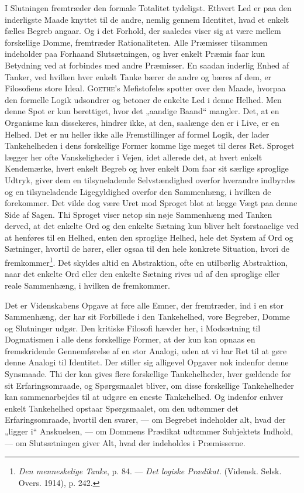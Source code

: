 \documentclass[12pt]{article}
\newcommand{\opage}[1]{\marginnote{\footnotesize\textit{[#1]}}}
\begin{document}
I Slutningen fremtræder den formale Totalitet tydeligst. Ethvert Led er paa den
inderligste Maade knyttet til de andre, nemlig gennem Identitet, hvad et enkelt
fælles Begreb angaar. Og i det Forhold, der saaledes viser sig at være mellem
forskellige Domme, fremtræder Rationaliteten. Alle Præmisser tilsammen indeholder
paa Forhaand Slutsætningen, og hver enkelt Præmis faar kun Betydning ved
at forbindes med andre Præmisser. En saadan inderlig Enhed af Tanker, ved
hvilken hver enkelt Tanke bærer de andre og bæres af dem, er Filosofiens store
Ideal. \textsc{Goethe}'s Mefistofeles spotter over den Maade, hvorpaa den formelle Logik
udsondrer og betoner de enkelte Led i denne Helhed. Men denne Spot er kun
berettiget, hvor det „aandige Baand“ mangler. Det, at en Organisme kan
dissekeres, hindrer ikke, at den, saalænge den er i Live, er en Helhed. Det er nu
heller ikke alle Fremstillinger af formel Logik, der lader Tankehelheden i dens
forskellige Former komme lige meget til deres Ret. Sproget lægger her ofte
Vanskeligheder i Vejen, idet allerede det, at hvert enkelt Kendemærke, hvert enkelt
Begreb og hver enkelt Dom faar sit særlige sproglige Udtryk, giver dem en
tilsyneladende Selvstændighed overfor hverandre indbyrdes og en tilsyneladende
Ligegyldighed overfor den Sammenhæng, i hvilken de forekommer. Det vilde dog være
Uret mod Sproget blot at lægge Vægt paa denne Side af Sagen. Thi Sproget viser
\setcounter{footnote}{0}%
\opage{32}netop sin nøje Sammenhæng med Tanken derved, at det enkelte Ord og den enkelte
Sætning kun bliver helt forstaaelige ved at henføres til en Helhed, enten den
sproglige Helhed, hele det System af Ord og Sætninger, hvortil de hører, eller ogsaa til
den hele konkrete Situation, hvori de fremkommer\footnote{\textit{Den menneskelige
Tanke}, p. 84. --- \textit{Det logiske Prædikat.} (Vidensk. Selsk. Overs. 1914), p.
242.}. Det skyldes altid en Abstraktion, ofte en utilbørlig Abstraktion, naar det
enkelte Ord eller den enkelte Sætning
rives ud af den sproglige eller reale Sammenhæng, i hvilken de fremkommer.

Det er Videnskabens Opgave at føre alle Emner, der fremtræder, ind i en stor
Sammenhæng, der har sit Forbillede i den Tankehelhed, vore Begreber, Domme og
Slutninger udgør. Den kritiske Filosofi hævder her, i Modsætning til Dogmatismen
i alle dens forskellige Former, at der kun kan opnaas en fremskridende
Gennemførelse af en stor Analogi, uden at vi har Ret til at gøre denne Analogi til
Identitet. Der stiller sig alligevel Opgaver nok indenfor denne Synsmaade. Thi
der kan gives flere forskellige Tankehelheder, hver gældende for sit
Erfaringsomraade, og Spørgsmaalet bliver, om disse forskellige Tankehelheder kan
sammenarbejdes til at udgøre en eneste Tankehelhed. Og indenfor enhver enkelt
Tankehelhed opstaar Spørgsmaalet, om den udtømmer det Erfaringsomraade, hvortil den
svarer, --- om Begrebet indeholder alt, hvad der „ligger i“ Anskuelsen, --- om
Dommens Prædikat udtømmer Subjektets Indhold, --- om Slutsætningen giver Alt, hvad
der indeholdes i Præmisserne.
\end{document}
